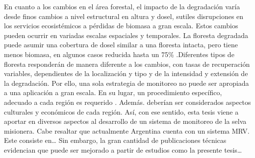 En cuanto a los cambios en el área forestal, el impacto de la degradación varía desde finos cambios a nivel estructural en altura y dosel, sutiles disrupciones en los servicios ecosistémicos a pérdidas de biomasa a gran escala. Estos cambios pueden ocurrir en variadas escalas espaciales y temporales. La floresta degradada puede asumir una cobertura de dosel similar a una floresta intacta, pero tiene menos biomasa, en algunos casos reducida hasta un 75\% \cite{change_report_2006}.Diferentes tipos de floresta responderán de manera diferente a los cambios, con tasas de recuperación variables, dependientes de la localización y tipo y de la intensidad y extensión de la degradación. Por ello, una sola estrategia de monitoreo no puede ser apropiada a una aplicación a gran escala. En su lugar, un procedimiento específico, adecuado a cada región es requerido \cite{mitchell_current_2017}. Además. deberían ser considerados aspectos culturales y económicos de cada región. Así, con ese sentido, esta tesis viene a aportar en diversos aspectos al desarrollo de un sistema de monitoreo de la selva misionera.
Cabe resaltar que actualmente Argentina cuenta con un sistema MRV. Este consiste en…
Sin embargo, la gran cantidad de publicaciones técnicas evidencian que puede ser mejorado a partir de estudios como la presente tesis…

